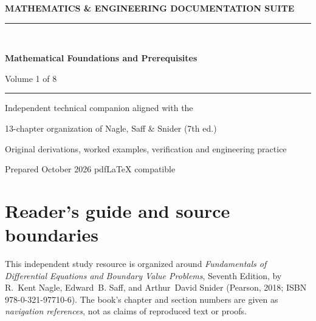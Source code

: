 \documentclass[11pt,letterpaper,oneside]{report}
\theoremstyle{definition}\newtheorem{definition}[theorem]{Definition}
\theoremstyle{remark}\newtheorem{remark}[theorem]{Remark}
\begin{document}
\hypersetup{pageanchor=false}%
\begin{titlepage}
\pagecolor{navy}\color{white}
\vspace*{0.75in}
{\sffamily\bfseries\large MATHEMATICS \& ENGINEERING DOCUMENTATION SUITE\\[12pt]}
{\color{cyan!40}\rule{\textwidth}{2pt}}\\[1.0in]
{\sffamily\bfseries\fontsize{29}{36}\selectfont Mathematical Foundations and Prerequisites\par}
\vspace{0.45in}
{\Large Volume 1 of 8}\par\vspace{0.55in}
{\color{cyan!30}\rule{0.50\textwidth}{1pt}}\par\vspace{0.3in}
{\large Independent technical companion aligned with the\par}
{\large 13-chapter organization of Nagle, Saff \& Snider (7th ed.)\par}
\vfill
{\large Original derivations, worked examples, verification and engineering practice\par}\vspace{0.3in}
{\small Prepared October 2026 \quad\textbullet\quad pdf\LaTeX{} compatible\par}
\end{titlepage}\hypersetup{pageanchor=true}
\nopagecolor\color{ink}
\chapter*{Reader's guide and source boundaries}
This independent study resource is organized around \emph{Fundamentals of Differential Equations and Boundary Value Problems}, Seventh Edition, by R.~Kent Nagle, Edward~B. Saff, and Arthur~David Snider (Pearson, 2018; ISBN 978-0-321-97710-6). The book's chapter and section numbers are given as \emph{navigation references}, not as claims of reproduced text or proofs.
\end{document}
